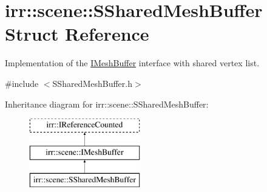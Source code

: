 \hypertarget{structirr_1_1scene_1_1SSharedMeshBuffer}{}\section{irr\+:\+:scene\+:\+:S\+Shared\+Mesh\+Buffer Struct Reference}
\label{structirr_1_1scene_1_1SSharedMeshBuffer}


Implementation of the \hyperlink{classirr_1_1scene_1_1IMeshBuffer}{I\+Mesh\+Buffer} interface with shared vertex list.  




{\ttfamily \#include $<$S\+Shared\+Mesh\+Buffer.\+h$>$}

Inheritance diagram for irr\+:\+:scene\+:\+:S\+Shared\+Mesh\+Buffer\+:\begin{figure}[H]
\begin{center}
\leavevmode
\includegraphics[height=3.000000cm]{structirr_1_1scene_1_1SSharedMeshBuffer}
\end{center}
\end{figure}
